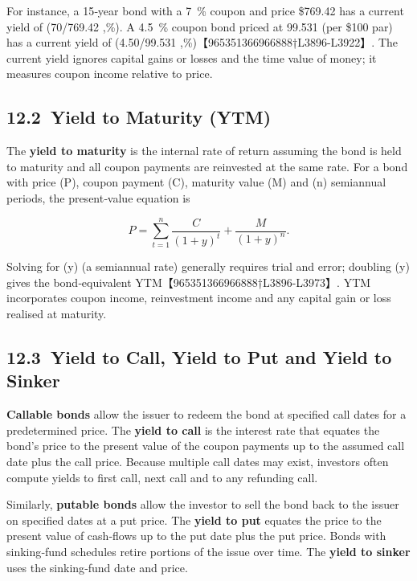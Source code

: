 \documentclass[
  letterpaper,
  DIV=11,
  numbers=noendperiod]{scrartcl}
\begin{document}
For instance, a 15‑year bond with a 7~\% coupon and price \$769.42 has a
current yield of (70/769.42 ,\%). A 4.5~\% coupon bond
priced at 99.531 (per \$100 par) has a current yield of (4.50/99.531
,\%)【965351366966888†L3896-L3922】. The current yield
ignores capital gains or losses and the time value of money; it measures
coupon income relative to price.

\subsection{12.2~Yield to Maturity (YTM)}\label{yield-to-maturity-ytm}

The \textbf{yield to maturity} is the internal rate of return assuming
the bond is held to maturity and all coupon payments are reinvested at
the same rate. For a bond with price (P), coupon payment (C), maturity
value (M) and (n) semiannual periods, the present‑value equation is

\[
P = \sum_{t=1}^{n} \frac{C}{(1+y)^t} + \frac{M}{(1+y)^n}.
\]

Solving for (y) (a semiannual rate) generally requires trial and error;
doubling (y) gives the bond‑equivalent
YTM【965351366966888†L3896-L3973】. YTM incorporates coupon income,
reinvestment income and any capital gain or loss realised at maturity.

\subsection{12.3~Yield to Call, Yield to Put and Yield to
Sinker}\label{yield-to-call-yield-to-put-and-yield-to-sinker}

\textbf{Callable bonds} allow the issuer to redeem the bond at specified
call dates for a predetermined price. The \textbf{yield to call} is the
interest rate that equates the bond's price to the present value of the
coupon payments up to the assumed call date plus the call price. Because
multiple call dates may exist, investors often compute yields to first
call, next call and to any refunding call.

Similarly, \textbf{putable bonds} allow the investor to sell the bond
back to the issuer on specified dates at a put price. The \textbf{yield
to put} equates the price to the present value of cash‑flows up to the
put date plus the put price. Bonds with sinking‑fund schedules retire
portions of the issue over time. The \textbf{yield to sinker} uses the
sinking‑fund date and price.
\end{document}
